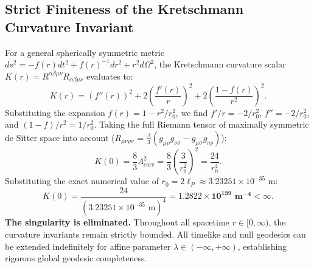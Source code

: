 \documentclass[11pt,a4paper]{article}
\begin{document}
\subsection{Strict Finiteness of the Kretschmann Curvature Invariant}
For a general spherically symmetric metric $ds^2 = -f(r) dt^2 + f(r)^{-1} dr^2 + r^2 d\Omega^2$, the Kretschmann curvature scalar $K(r) = R^{\alpha\beta\mu\nu} R_{\alpha\beta\mu\nu}$ evaluates to:
\begin{equation}
K(r) = \left(f''(r)\right)^2 + 2\left(\frac{f'(r)}{r}\right)^2 + 2\left(\frac{1 - f(r)}{r^2}\right)^2.
\end{equation}
Substituting the expansion $f(r) = 1 - r^2/r_0^2$, we find $f'/r = -2/r_0^2$, $f'' = -2/r_0^2$, and $(1-f)/r^2 = 1/r_0^2$. Taking the full Riemann tensor of maximally symmetric de Sitter space into account ($R_{\mu\nu\rho\sigma} = \frac{\Lambda}{3}(g_{\mu\rho}g_{\nu\sigma} - g_{\mu\sigma}g_{\nu\rho})$):
\begin{equation}
K(0) = \frac{8}{3} \Lambda_{\mathrm{core}}^2 = \frac{8}{3} \left(\frac{3}{r_0^2}\right)^2 = \frac{24}{r_0^4}.
\end{equation}
Substituting the exact numerical value of $r_0 = 2\ell_P \approx 3.23251 \times 10^{-35}\text{ m}$:
\begin{equation}
K(0) = \frac{24}{(3.23251 \times 10^{-35}\text{ m})^4} = \mathbf{1.2822 \times 10^{139}\text{ m}^{-4}} < \infty.
\end{equation}
\textbf{The singularity is eliminated.} Throughout all spacetime $r \in [0, \infty)$, the curvature invariants remain strictly bounded. All timelike and null geodesics can be extended indefinitely for affine parameter $\lambda \in (-\infty, +\infty)$, establishing rigorous global geodesic completeness.
\end{document}
